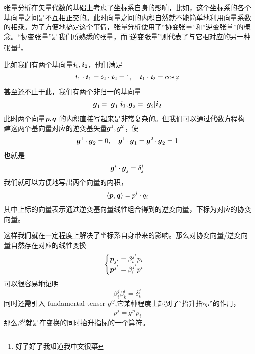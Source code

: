 \documentclass[12pt,a4paper,openany,twoside]{book}
\numberwithin{equation}{section}
\newcommand{\mean}[1]{\left\langle #1 \right\rangle}
\begin{document}
          {}

          张量分析在矢量代数的基础上考虑了坐标系自身的影响，比如，这个坐标系的各个基向量之间是不互相正交的。此时向量之间的内积自然就不能简单地利用向量系数的相乘。为了方便地搞定这个事情，张量分析使用了“协变张量”和“逆变张量”的概念。“协变张量”是我们所熟悉的张量，而“逆变张量”则代表了与它相对应的另一种张量\footnote{\sout{好了好了我知道我中文很菜}}。

          比如我们有两个基向量$\vb*{i}_1,\vb*{i}_2$，他们满足
          \begin{equation*}
            \vb*{i}_1 \cdot \vb*{i}_1 = \vb*{i}_2 \cdot \vb*{i}_2 = 1, \quad \vb*{i}_1 \cdot \vb*{i}_2 = \cos{\varphi}
          \end{equation*} 
          甚至还不止于此，我们有两个非归一的基向量
          \begin{equation*}
            \vb*{g}_1 = \abs{\vb*{g}_1} \vb*{i}_1, \vb*{g}_2 = \abs{\vb*{g}_2} \vb*{i}_2
          \end{equation*} 
          此时两个向量$\vb*{p},\vb*{q}$ 的内积直接写起来是非常复杂的。但我们可以通过代数方程构建这两个基向量对应的逆变基矢量$\vb*{g}^1,\vb*{g}^2$，使
          \begin{equation*}
            \vb*{g}^1 \cdot \vb*{g}_2  = 0, \quad \vb*{g}^1 \cdot \vb*{g}_1 = \vb*{g}^2 \cdot \vb*{g}_2 = 1 
          \end{equation*} 
          也就是
          \begin{equation*}
            \vb*{g}^i \cdot \vb*{g}_j = \delta^i_j
          \end{equation*}
          我们就可以方便地写出两个向量的内积，
          \begin{equation*}
            \mean{\vb*{p},\vb*{q}} = p^i \cdot q_i
          \end{equation*} 
          其中上标的向量表示通过逆变基向量线性组合得到的逆变向量，下标为对应的协变向量。

          这样我们就在一定程度上解决了坐标系自身带来的影响。那么对协变向量/逆变向量自然存在对应的线性变换
          \begin{equation*}
            \begin{cases}
              \vb*{p}_{j'} = \beta^{j'}_i p_i \\
              \vb*{p}^{j'} = \beta^{j'}_i p^i
            \end{cases}
          \end{equation*} 
          可以很容易地证明
          \begin{equation*}
            \beta^j_i \beta^i_k = \delta^j_k
          \end{equation*}
          同时还需引入 fundamental tensor $g^{ij}$,它某种程度上起到了“抬升指标”的作用，
          \begin{equation*}
            p^j = g^{ji} p_i
          \end{equation*} 
          那么$\beta^{ij}$就是在变换的同时抬升指标的一个算符。
\end{document}
